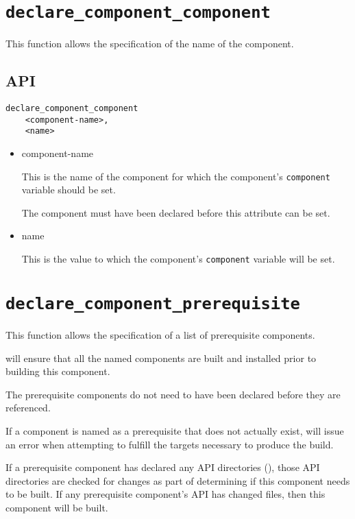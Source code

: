 \section{\texttt{declare\_component\_component}}\label{api:component}

This function allows the specification of the name of the component.

\subsection{API}

\begin{verbatim}
declare_component_component
    <component-name>,
    <name>
\end{verbatim}

\begin{itemize}
\item component-name

  This is the name of the component for which the component's
  \texttt{component} variable should be set.

  The component must have been declared before this attribute can be
  set.

\item name

  This is the value to which the component's \texttt{component}
  variable will be set.

\end{itemize}

\section{\texttt{declare\_component\_prerequisite}}\label{api:prerequisite}

This function allows the specification of a list of prerequisite
components.

\lmsbw will ensure that all the named components are built and
installed prior to building this component.

The prerequisite components do not need to have been declared before
they are referenced.

If a component is named as a prerequisite that does not actually
exist, \make will issue an error when attempting to fulfill the
targets necessary to produce the build.

If a prerequisite component has declared any API directories
(), those API directories are
checked for changes as part of determining if this component needs to
be built.  If any prerequisite component's API has changed files, then
this component will be built.

